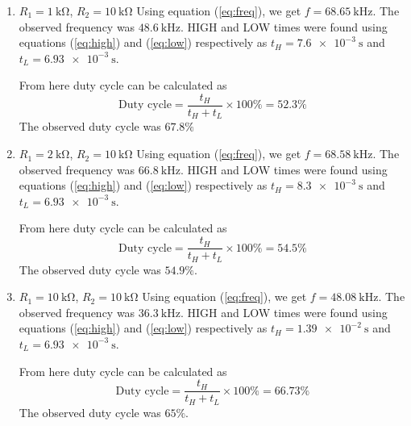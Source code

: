 \documentclass[%
 aip,
 amsmath,amssymb,
 reprint, floatfix%
]{revtex4-1}
\begin{document}
    \begin{enumerate}
        \item $R_1 = \SI{1}{\kilo \ohm}$, $R_2 = \SI{10}{\kilo \ohm}$
        Using equation (\ref{eq:freq}), we get $f = \SI{68.65}{\kilo \hertz}$. The observed frequency was $\SI{48.6}{\kilo \hertz}$. HIGH and LOW times were found using equations (\ref{eq:high}) and (\ref{eq:low}) respectively as $t_H = \SI{7.6e-3}{\second}$ and $t_L = \SI{6.93e-3}{\second}$.
        \par
        From here duty cycle can be calculated as
        \begin{equation}
            \text{Duty cycle} = \dfrac{t_H}{t_H + t_L} \times 100 \% = 52.3 \%
        \end{equation}
        The observed duty cycle was $67.8 \%$
        \item $R_1 = \SI{2}{\kilo \ohm}$, $R_2 = \SI{10}{\kilo \ohm}$
        Using equation (\ref{eq:freq}), we get $f = \SI{68.58}{\kilo \hertz}$. The observed frequency was $\SI{66.8}{\kilo \hertz}$. HIGH and LOW times were found using equations (\ref{eq:high}) and (\ref{eq:low}) respectively as $t_H = \SI{8.3e-3}{\second}$ and $t_L = \SI{6.93e-3}{\second}$.
        \par
        From here duty cycle can be calculated as
        \begin{equation}
            \text{Duty cycle} = \dfrac{t_H}{t_H + t_L} \times 100 \% = 54.5 \%
        \end{equation}
        The observed duty cycle was $54.9 \%$.
        \item $R_1 = \SI{10}{\kilo \ohm}$, $R_2 = \SI{10}{\kilo \ohm}$
        Using equation (\ref{eq:freq}), we get $f = \SI{48.08}{\kilo \hertz}$. The observed frequency was $\SI{36.3}{\kilo \hertz}$. HIGH and LOW times were found using equations (\ref{eq:high}) and (\ref{eq:low}) respectively as $t_H = \SI{1.39e-2}{\second}$ and $t_L = \SI{6.93e-3}{\second}$.
        \par
        From here duty cycle can be calculated as
        \begin{equation}
            \text{Duty cycle} = \dfrac{t_H}{t_H + t_L} \times 100 \% = 66.73 \%
        \end{equation}
        The observed duty cycle was $65 \%$.
    \end{enumerate}
\end{document}

